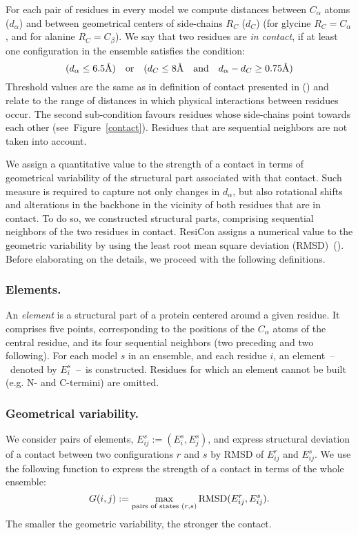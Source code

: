 For each pair of residues in every model we compute distances between $C_\alpha$ atoms ($d_\alpha$) and between geometrical centers of side-chains $R_C$ ($d_C$) (for glycine $R_C = C_\alpha$, and for alanine $R_C = C_\beta$).
We say that two residues are \emph{in contact}, if at least one configuration in the ensemble satisfies the condition:
\begin{equation}
(d_\alpha \leq 6.5\mbox{\normalfont\AA})\quad \text{or} \quad (d_C \leq 8\mbox{\normalfont\AA}\quad \text{and} \quad d_\alpha - d_C \geq 0.75\mbox{\normalfont\AA})
\label{condition}
\end{equation}
Threshold values are the same as in definition of contact presented in (\cite{daniluk2011novel}) and relate to the range of distances in which physical interactions between residues occur.
The second sub-condition favours residues whose side-chains point towards each other (see~Figure~\ref{contact}). 
Residues that are sequential neighbors are not taken into account.

We assign a quantitative value to the strength of a contact in terms of geometrical variability of the structural part associated with that contact.
Such measure is required to capture not only changes in $d_\alpha$, but also rotational shifts and alterations in the backbone in the vicinity of both residues that are in contact.
To do so, we constructed structural parts, comprising sequential neighbors of the two residues in contact.
ResiCon assigns a numerical value to the geometric variability by using the least root mean square deviation (RMSD)~(\cite{kabsch1976solution}).
Before elaborating on the details, we proceed with the following definitions.

\subsubsection*{Elements.}
An \emph{element} is a structural part of a protein centered around a given residue.
It comprises five points, corresponding to the positions of the $C_\alpha$ atoms of the central residue, and its four sequential neighbors (two preceding and two following).
For each model $s$ in an ensemble, and each residue $i$, an element~--~denoted by $E_i^s$~--~is constructed.
Residues for which an element cannot be built (e.g. N- and C-termini) are omitted.

\subsubsection*{Geometrical variability.}
We consider pairs of elements, $E_{ij}^s := ( E_i^s , E_j^s )$, and express structural deviation of a contact between two configurations $r$ and $s$ by RMSD of $E_{ij}^r$ and $E_{ij}^s$.
We use the following function to express the strength of a contact in terms of the whole ensemble:
\begin{displaymath}
G(i,j) := \max_{\text{pairs of states }\\(r,s)} \text{RMSD}(E_{ij}^r,E_{ij}^s) .
\end{displaymath}
The smaller the geometric variability, the stronger the contact.

